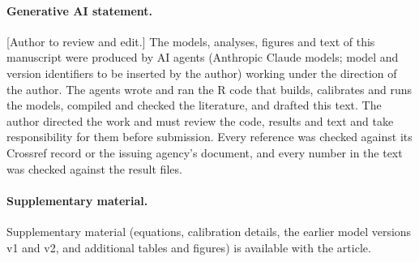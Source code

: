 \documentclass[12pt,letterpaper,fleqn]{article}
\begin{document}
\paragraph{Generative AI statement.} [Author to review and edit.] The models, analyses, figures and text of this manuscript were produced by AI agents (Anthropic Claude models; model and version identifiers to be inserted by the author) working under the direction of the author. The agents wrote and ran the R code that builds, calibrates and runs the models, compiled and checked the literature, and drafted this text. The author directed the work and must review the code, results and text and take responsibility for them before submission. Every reference was checked against its Crossref record or the issuing agency's document, and every number in the text was checked against the result files.

\paragraph{Supplementary material.} Supplementary material (equations, calibration details, the earlier model versions v1 and v2, and additional tables and figures) is available with the article.

\clearpage
\begingroup
\singlespacing
\nolinenumbers
\printbibliography[title={References}]
\endgroup
\end{document}
